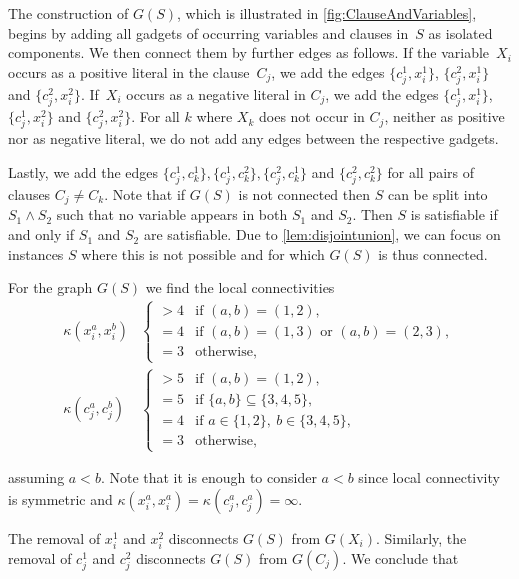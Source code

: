 \documentclass[letterpaper,12pt,headings=normal,parskip=half]{scrartcl}
\theoremstyle{definition}
\begin{document}
The construction of $G(S)$, which is illustrated in \cref{fig:ClauseAndVariables}, begins by adding all gadgets of occurring variables and clauses in~$S$ as isolated components. 
We then connect them by further edges as follows.
If the variable~$X_i$ occurs as a positive literal in the clause~$C_j$, we add the edges $\{c_j^1,x_i^1\}$, $\{c_j^2,x_i^1\}$ and $\{c_j^2,x_i^2\}$. 
If~$X_i$ occurs as a negative literal in $C_j$, we add the edges $\{c_j^1,x_i^1\}$, $\{c_j^1,x_i^2\}$ and $\{c_j^2,x_i^2\}$. 
For all $k$ where $X_k$ does not occur in $C_j$, neither as positive nor as negative literal, we do not add any edges between the respective gadgets. 

Lastly, we add the edges $\{c_j^1,c_k^1\},\{c_j^1,c_k^2\}, \{c_j^2,c_k^1\}$ and $\{c_j^2,c_k^2\}$ for all pairs of clauses $C_j\neq C_k$.
Note that if $G(S)$ is not connected then $S$ can be split into $S_1\wedge S_2$ such that no variable appears in both $S_1$ and $S_2$.
Then $S$ is satisfiable if and only if $S_1$ and $S_2$ are satisfiable.
Due to \cref{lem:disjointunion}, we can focus on instances $S$ where this is not possible and for which $G(S)$ is thus connected.

For the graph $G(S)$ we find the local connectivities 
\begin{align}
    \kappa(x_i^a,x_i^b)&\begin{cases}
        > 4 &\text{if } (a,b)=(1,2),\\
        =4 &\text{if } (a,b)=(1,3)\text{ or }(a,b)=(2,3),\\
        =3 &\text{otherwise,}
    \end{cases}\label{eq:samevargadget}\\[1ex]
    \kappa(c_j^a,c_j^b)&\begin{cases}
        >5 &\text{if } (a,b)=(1,2),\\
        =5 &\text{if } \{a,b\}\subseteq\{3,4,5\},\\
        =4 &\text{if } a\in\{1,2\},~b\in\{3,4,5\},\\
        =3 &\text{otherwise},
    \end{cases}\label{eq:sameclagadget}
\end{align}

assuming $a<b$.
Note that it is enough to consider $a<b$ since local connectivity is symmetric and $\kappa(x_i^a,x_i^a)=\kappa(c_j^a,c_j^a)=\infty$.

The removal of $x_i^1$ and $x_i^2$ disconnects $G(S)$ from $G(X_i)$. 
Similarly, the removal of $c_j^1$ and $c_j^2$ disconnects $G(S)$ from $G(C_j)$.
We conclude that
\end{document}
